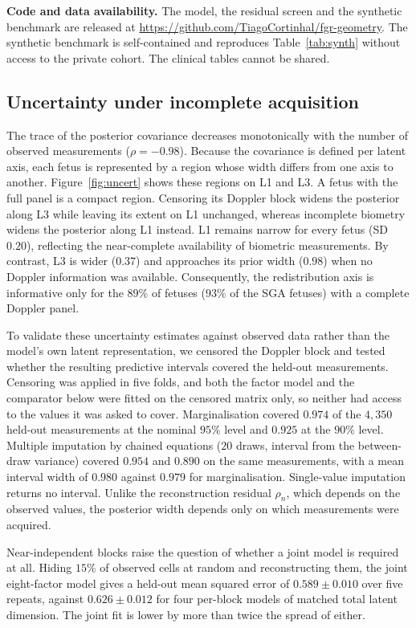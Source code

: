 \documentclass[a4paper,fleqn]{cas-sc}
\begin{document}
\noindent\textbf{Code and data availability.} The model, the residual screen and the synthetic benchmark are released at \url{https://github.com/TiagoCortinhal/fgr-geometry}. The synthetic benchmark is self-contained and reproduces Table~\ref{tab:synth} without access to the private cohort. The clinical tables cannot be shared.

\subsection{Uncertainty under incomplete acquisition} The trace of the posterior covariance decreases monotonically with the number of observed measurements ($\rho=-0.98$). Because the covariance is defined per latent axis, each fetus is represented by a region whose width differs from one axis to another. Figure~\ref{fig:uncert} shows these regions on L1 and L3. A fetus with the full panel is a compact region. Censoring its Doppler block widens the posterior along L3 while leaving its extent on L1 unchanged, whereas incomplete biometry widens the posterior along L1 instead. L1 remains narrow for every fetus (SD $0.20$), reflecting the near-complete availability of biometric measurements. By contrast, L3 is wider ($0.37$) and approaches its prior width ($0.98$) when no Doppler information was available. Consequently, the redistribution axis is informative only for the $89\%$ of fetuses ($93\%$ of the SGA fetuses) with a complete Doppler panel.

To validate these uncertainty estimates against observed data rather than the model's own latent
representation, we censored the Doppler block and tested whether the resulting predictive intervals covered
the held-out measurements. Censoring was applied in five folds, and both the factor model and the
comparator below were fitted on the censored matrix only, so neither had access to the values it was asked
to cover. Marginalisation covered $0.974$ of the $4{,}350$ held-out measurements at the nominal $95\%$
level and $0.925$ at the $90\%$ level. Multiple imputation by chained equations ($20$ draws, interval from
the between-draw variance) covered $0.954$ and $0.890$ on the same measurements, with a mean interval width
of $0.980$ against $0.979$ for marginalisation. Single-value imputation returns no interval. Unlike the reconstruction residual $\rho_n$, which depends on the observed values, the posterior width depends only on which measurements were acquired.

Near-independent blocks raise the question of whether a joint model is required at all. Hiding
$15\%$ of observed cells at random and reconstructing them, the joint eight-factor model gives a held-out
mean squared error of $0.589\pm0.010$ over five repeats, against $0.626\pm0.012$ for four per-block models
of matched total latent dimension. The joint fit is lower by more than twice the spread of either.
\end{document}
